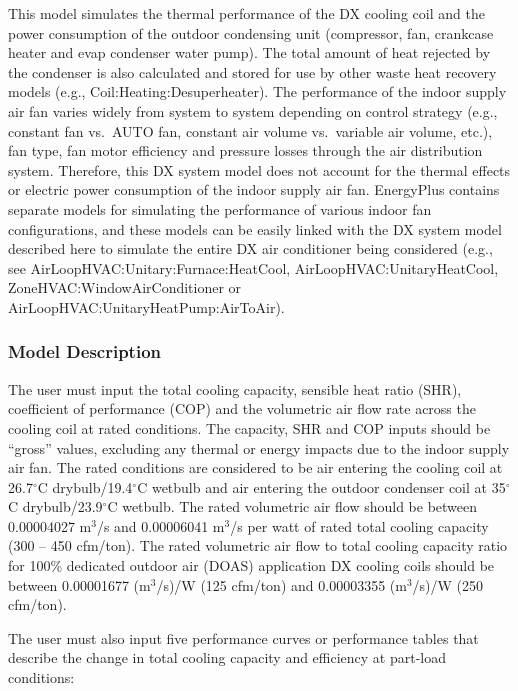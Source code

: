 This model simulates the thermal performance of the DX cooling coil and the power consumption of the outdoor condensing unit (compressor, fan, crankcase heater and evap condenser water pump). The total amount of heat rejected by the condenser is also calculated and stored for use by other waste heat recovery models (e.g., Coil:Heating:Desuperheater). The performance of the indoor supply air fan varies widely from system to system depending on control strategy (e.g., constant fan vs.~AUTO fan, constant air volume vs.~variable air volume, etc.), fan type, fan motor efficiency and pressure losses through the air distribution system. Therefore, this DX system model does not account for the thermal effects or electric power consumption of the indoor supply air fan. EnergyPlus contains separate models for simulating the performance of various indoor fan configurations, and these models can be easily linked with the DX system model described here to simulate the entire DX air conditioner being considered (e.g., see AirLoopHVAC:Unitary:Furnace:HeatCool, AirLoopHVAC:UnitaryHeatCool, ZoneHVAC:WindowAirConditioner or AirLoopHVAC:UnitaryHeatPump:AirToAir).

\subsubsection{Model Description}\label{model-description-2-004}

The user must input the total cooling capacity, sensible heat ratio (SHR), coefficient of performance (COP) and the volumetric air flow rate across the cooling coil at rated conditions. The capacity, SHR and COP inputs should be ``gross'' values, excluding any thermal or energy impacts due to the indoor supply air fan. The rated conditions are considered to be air entering the cooling coil at 26.7\(^{\circ}\)C drybulb/19.4\(^{\circ}\)C wetbulb and air entering the outdoor condenser coil at 35\(^{\circ}\)C drybulb/23.9\(^{\circ}\)C wetbulb. The rated volumetric air flow should be between 0.00004027 m\(^{3}\)/s and 0.00006041 m\(^{3}\)/s per watt of rated total cooling capacity (300 -- 450 cfm/ton). The rated volumetric air flow to total cooling capacity ratio for 100\% dedicated outdoor air (DOAS) application DX cooling coils should be between 0.00001677 (m\(^{3}\)/s)/W (125 cfm/ton) and 0.00003355 (m\(^{3}\)/s)/W (250 cfm/ton).

The user must also input five performance curves or performance tables that describe the change in total cooling capacity and efficiency at part-load conditions:


